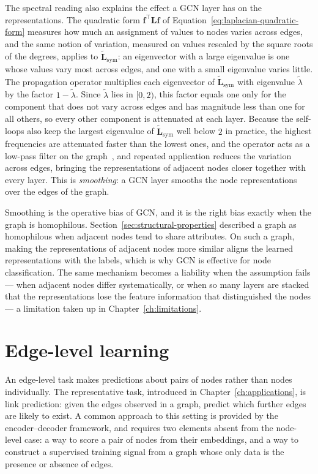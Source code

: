 The spectral reading also explains the effect a GCN layer has on the
representations. The quadratic form $\mathbf{f}^\top \mathbf{L} \mathbf{f}$ of
Equation~\eqref{eq:laplacian-quadratic-form} measures how much an assignment of
values to nodes varies across edges, and the same notion of variation,
measured on values rescaled by the square
roots of the degrees, applies to $\tilde{\mathbf{L}}_{\mathrm{sym}}$: an
eigenvector with a large eigenvalue is one whose values vary most across
edges, and one with a small eigenvalue varies little. The propagation operator
multiplies each eigenvector of $\tilde{\mathbf{L}}_{\mathrm{sym}}$ with
eigenvalue $\tilde{\lambda}$ by the factor $1 - \tilde{\lambda}$. Since
$\tilde{\lambda}$ lies in $[0, 2)$, this factor equals one only for the
component that does not vary across edges and has magnitude less than one for
all others, so every other component is attenuated at each layer. Because the
self-loops also keep the largest eigenvalue of
$\tilde{\mathbf{L}}_{\mathrm{sym}}$ well below $2$ in practice, the highest
frequencies are attenuated faster than the lowest ones, and the operator acts
as a low-pass filter on the graph~\cite{wu2019},
and repeated application reduces the variation across edges,
bringing the representations of adjacent nodes closer together with every layer.
This is \textit{smoothing}: a GCN layer smooths the node representations over the
edges of the graph.

Smoothing is the operative bias of GCN, and it is the right bias exactly when the
graph is homophilous. Section~\ref{sec:structural-properties} described a graph as
homophilous when adjacent nodes tend to share attributes.
On such a graph, making the representations of adjacent nodes
more similar aligns the learned representations with the labels, which is why GCN is effective
for node classification. The same mechanism 
becomes a liability when the assumption fails --- when adjacent nodes
differ systematically, or when so many layers are stacked that the representations
lose the feature information that distinguished the nodes --- a limitation taken up in
Chapter~\ref{ch:limitations}.

\section{Edge-level learning}
\label{sec:edge-level-arch}

An edge-level task makes predictions about pairs of nodes rather than nodes
individually. The representative task, introduced in
Chapter~\ref{ch:applications}, is link prediction: given the edges observed in a
graph, predict which further edges are likely to exist. A common approach to this 
setting is provided by the encoder--decoder framework, and requires two
elements absent from the node-level case: a way to score a pair of nodes from
their embeddings, and a way to construct a supervised training signal from a graph
whose only data is the presence or absence of edges.

